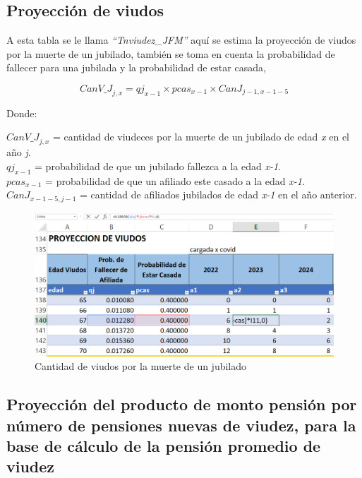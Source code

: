 \documentclass[
  letterpaper,
  DIV=11,
  numbers=noendperiod]{scrreprt}
\begin{document}
\hypertarget{proyecciuxf3n-de-viudos-1}{%
\subsection{Proyección de viudos}\label{proyecciuxf3n-de-viudos-1}}

A esta tabla se le llama \emph{``Tnviudez\_JFM''} aquí se estima la
proyección de viudos por la muerte de un jubilado, también se toma en
cuenta la probabilidad de fallecer para una jubilada y la probabilidad
de estar casada,

\begin{equation}
{CanV\_J}_{j,x}={qj}_{x-1}\times pcas_{x-1}\times{CanJ}_{j-1,x-1-5}
\end{equation}

Donde:

\(Can{V\_J}_{j,x}\) = cantidad de viudeces por la muerte de un jubilado
de edad \emph{x} en el año \emph{j}.\\
\({qj}_{x-1}\) = probabilidad de que un jubilado fallezca a la edad
\emph{x-1}.\\
\(pcas_{x-1}\) = probabilidad de que un afiliado este casado a la edad
\emph{x-1}.\\
\({CanJ}_{x-1-5,j-1}\) = cantidad de afiliados jubilados de edad
\emph{x-1} en el año anterior.

\begin{figure}

{\centering \includegraphics{images/F/Img30.png}

}

\caption{Cantidad de viudos por la muerte de un jubilado}

\end{figure}

\hypertarget{proyecciuxf3n-del-producto-de-monto-pensiuxf3n-por-nuxfamero-de-pensiones-nuevas-de-viudez-para-la-base-de-cuxe1lculo-de-la-pensiuxf3n-promedio-de-viudez}{%
\subsection{Proyección del producto de monto pensión por número de
pensiones nuevas de viudez, para la base de cálculo de la pensión
promedio de
viudez}\label{proyecciuxf3n-del-producto-de-monto-pensiuxf3n-por-nuxfamero-de-pensiones-nuevas-de-viudez-para-la-base-de-cuxe1lculo-de-la-pensiuxf3n-promedio-de-viudez}}
\end{document}
